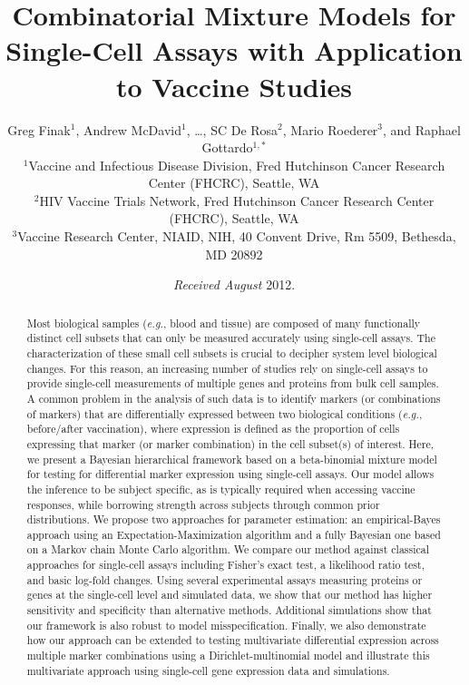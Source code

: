 \documentclass[useAMS,referee,usenatbib]{biom}
\title[MIMOSA: Combinatorial Mixture Models or Single-Cell Assays]{Combinatorial Mixture Models for Single-Cell Assays with Application to Vaccine Studies}
\author{Greg Finak$^{1}$, Andrew McDavid$^{1}$, \ldots, SC De Rosa$^{2}$, Mario Roederer$^{3}$, and Raphael Gottardo$^{1,*}$\email{rgottard@fhcrc.org}\\
$^{1}$Vaccine and Infectious Disease Division, Fred Hutchinson Cancer Research Center (FHCRC), Seattle, WA\\
$^{2}$HIV Vaccine Trials Network, Fred Hutchinson Cancer Research Center (FHCRC), Seattle, WA\\
$^{3}$Vaccine Research Center, NIAID, NIH, 40 Convent Drive, Rm 5509, Bethesda, MD 20892}
\begin{document}
\date{{\it Received August} 2012.}

\pagerange{\pageref{firstpage}-\pageref{lastpage}} 
\volume{ }
\pubyear{ }
\artmonth{ }


\label{firstpage}

\begin{abstract}
Most biological samples (\textit{e.g.}, blood and tissue) are composed of many functionally distinct cell subsets that can only be measured accurately using single-cell assays. The characterization of these small cell subsets is crucial to decipher system level biological changes. For this reason, an increasing number of studies rely on single-cell assays to provide single-cell measurements of multiple genes and proteins from bulk cell samples. A common problem in the analysis of such data is to identify markers (or combinations of markers) that are differentially expressed between two biological conditions (\textit{e.g.}, before/after vaccination), where expression is defined as the proportion of cells expressing that marker (or marker combination) in the cell subset(s) of interest.
Here, we present a Bayesian hierarchical framework based on a beta-binomial mixture model for testing for differential marker expression using single-cell assays. Our model allows the inference to be subject specific, as is typically required when accessing vaccine responses, while borrowing strength across subjects through common prior distributions. We propose two approaches for parameter estimation: an empirical-Bayes approach using an Expectation-Maximization algorithm and a fully Bayesian one based on a Markov chain Monte Carlo algorithm. We compare our method against classical approaches for single-cell assays including Fisher's exact test, a likelihood ratio test, and basic log-fold changes. Using several experimental assays measuring proteins or genes at the single-cell level and simulated data, we show that our method has higher sensitivity and specificity than alternative methods. Additional simulations show that our framework is also robust to model misspecification. Finally, we also demonstrate how our approach can be extended to testing multivariate differential expression across multiple marker combinations using a Dirichlet-multinomial model and illustrate this multivariate approach using single-cell gene expression data and simulations.

\end{abstract}
\end{document}
